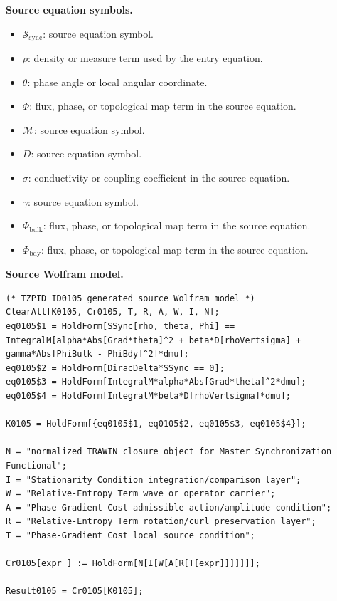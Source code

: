 \begin{minipage}[t]{0.49\linewidth}
\begingroup
\small
\raggedright
\textbf{Source equation symbols.}\par
\begin{itemize}[leftmargin=1.35em,itemsep=1pt,topsep=1pt,parsep=0pt]
    \item $\mathcal{S}_{\mathrm{sync}}$: source equation symbol.
    \item $\rho$: density or measure term used by the entry equation.
    \item $\theta$: phase angle or local angular coordinate.
    \item $\Phi$: flux, phase, or topological map term in the source equation.
    \item $\mathcal{M}$: source equation symbol.
    \item $D$: source equation symbol.
    \item $\sigma$: conductivity or coupling coefficient in the source equation.
    \item $\gamma$: source equation symbol.
    \item $\Phi_{\mathrm{bulk}}$: flux, phase, or topological map term in the source equation.
    \item $\Phi_{\mathrm{bdy}}$: flux, phase, or topological map term in the source equation.
\end{itemize}
\endgroup
\end{minipage}\hfill
\begin{minipage}[t]{0.47\linewidth}
\begingroup
\scriptsize
\raggedright
\textbf{Source Wolfram model.}\par
\begin{Verbatim}[fontsize=\tiny,breaklines=true,breakanywhere=true]
(* TZPID ID0105 generated source Wolfram model *)
ClearAll[K0105, Cr0105, T, R, A, W, I, N];
eq0105$1 = HoldForm[SSync[rho, theta, Phi] == IntegralM[alpha*Abs[Grad*theta]^2 + beta*D[rhoVertsigma] + gamma*Abs[PhiBulk - PhiBdy]^2]*dmu];
eq0105$2 = HoldForm[DiracDelta*SSync == 0];
eq0105$3 = HoldForm[IntegralM*alpha*Abs[Grad*theta]^2*dmu];
eq0105$4 = HoldForm[IntegralM*beta*D[rhoVertsigma]*dmu];

K0105 = HoldForm[{eq0105$1, eq0105$2, eq0105$3, eq0105$4}];

N = "normalized TRAWIN closure object for Master Synchronization Functional";
I = "Stationarity Condition integration/comparison layer";
W = "Relative-Entropy Term wave or operator carrier";
A = "Phase-Gradient Cost admissible action/amplitude condition";
R = "Relative-Entropy Term rotation/curl preservation layer";
T = "Phase-Gradient Cost local source condition";

Cr0105[expr_] := HoldForm[N[I[W[A[R[T[expr]]]]]]];

Result0105 = Cr0105[K0105];
\end{Verbatim}
\endgroup
\end{minipage}

